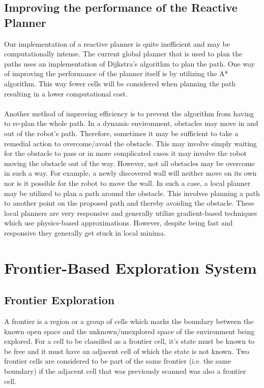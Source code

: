 \documentclass[a4paper,12pt]{article}
\begin{document}
		\subsection{Improving the performance of the Reactive Planner}

			Our implementation of a reactive planner is quite inefficient and may be computationally intense. The current global planner that is used to plan the paths uses an implementation of Dijkstra's algorithm to plan the path. One way of improving the performance of the planner itself is by utilizing the A* algorithm. This way fewer cells will be considered when planning the path resulting in a lower computational cost.
			\\
			\\
			Another method of improving efficiency is to prevent the algorithm from having to re-plan the whole path. In a dynamic environment, obstacles may move in and out of the robot's path. Therefore, sometimes it may be sufficient to take a remedial action to overcome/avoid the obstacle. This may involve simply waiting for the obstacle to pass or in more complicated cases it may involve the robot moving the obstacle out of the way. However, not all obstacles may be overcome in such a way. For example, a newly discovered wall will neither move on its own nor is it possible for the robot to move the wall. In such a case, a local planner may be utilized to plan a path around the obstacle. This involves planning a path to another point on the proposed path and thereby avoiding the obstacle. These local planners are very responsive and generally utilize gradient-based techniques which use physics-based approximations. However, despite being fast and responsive they generally get stuck in local minima. 
			
	
	\section{Frontier-Based Exploration System}

		\subsection{Frontier Exploration}

			A frontier is a region or a group of cells which marks the boundary between the known open space and the unknown/unexplored space of the environment being explored. For a cell to be classified as a frontier cell, it's state must be known to be free and it must have an adjacent cell of which the state is not known. Two frontier cells are considered to be part of the same frontier (i.e. the same boundary) if the adjacent cell that was previously scanned was also a frontier cell.\cite{keidar2011fast}
			
\end{document}
